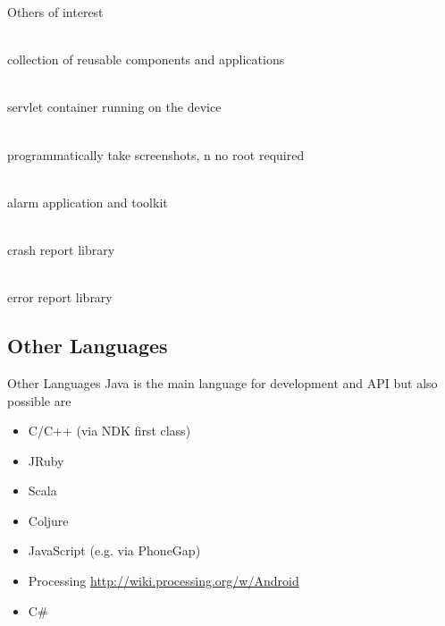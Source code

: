 \documentclass[aspectratio=169]{beamer}
\newcommand{\surl}[1] {{\tiny \url{#1}}}
\begin{document}
    \begin{frame}{Others of interest}
      \begin{description}
        \item<1->[OpenIntents \surl{http://code.google.com/p/openintents/}] \hfill \\ collection of reusable components and applications
        \item<2->[i-jetty \surl{http://code.google.com/p/i-jetty/}] \hfill \\ servlet container running on the device 
        \item<3->[Android Screenshot library \surl{http://code.google.com/p/android-screenshot-library/}] \hfill \\  programmatically take screenshots, n no root required 
        \item<4->[Android Alarm Database \surl{http://code.google.com/p/android-alarm-database/}] \hfill \\ alarm application and toolkit 
        \item<5->[Application Crash Report for Android ACRA \surl{http://code.google.com/p/acra/}] \hfill \\ crash report library
        \item<6->[Android Error Reporter \surl{https://github.com/tomquist/Android-Error-Reporter}] \hfill \\ error report library
      \end{description}
    \end{frame}

  \subsection{Other Languages}
    \begin{frame}{Other Languages}
      Java is the main language for development and API but also possible are 
      \begin{itemize}
      \item C/C++ (via NDK first class)
      \item JRuby
      \item Scala
      \item Coljure
      \item JavaScript (e.g. via PhoneGap)
      \item Processing \surl{http://wiki.processing.org/w/Android}
      \item C\#
      \end{itemize}
    \end{frame}
\end{document}
